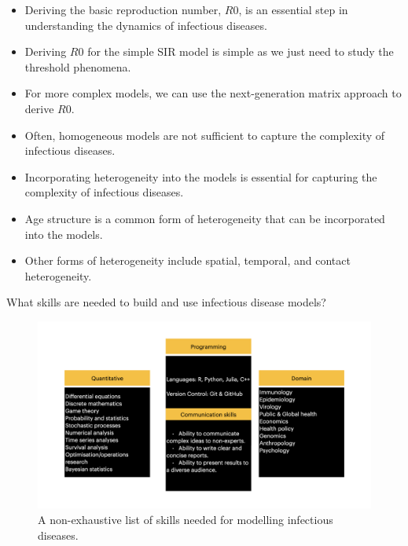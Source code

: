 \documentclass[
  ignorenonframetext,
]{beamer}
\begin{document}
\begin{frame}
\begin{itemize}
\item
  Deriving the basic reproduction number, \(R0\), is an essential step
  in understanding the dynamics of infectious diseases.
\item
  Deriving \(R0\) for the simple SIR model is simple as we just need to
  study the threshold phenomena.
\item
  For more complex models, we can use the next-generation matrix
  approach to derive \(R0\).
\end{itemize}
\end{frame}

\begin{frame}
\begin{itemize}
\item
  Often, homogeneous models are not sufficient to capture the complexity
  of infectious diseases.
\item
  Incorporating heterogeneity into the models is essential for capturing
  the complexity of infectious diseases.
\item
  Age structure is a common form of heterogeneity that can be
  incorporated into the models.
\item
  Other forms of heterogeneity include spatial, temporal, and contact
  heterogeneity.
\end{itemize}
\end{frame}

\begin{frame}
\begin{block}{What skills are needed to build and use infectious disease
models?}
\label{what-skills-are-needed-to-build-and-use-infectious-disease-models}
\begin{figure}[H]

{\centering \includegraphics{images/modelling_skills.jpeg}

}

\caption{A non-exhaustive list of skills needed for modelling infectious
diseases.}

\end{figure}%
\end{block}
\end{frame}
\end{document}
